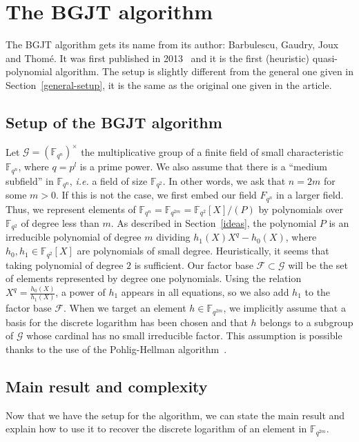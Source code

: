 \documentclass[a4paper,11pt]{article}
\theoremstyle{break}
\theoremstyle{sc}
\theoremstyle{definition}
\theoremstyle{remark}
\newcommand{\ie}{\emph{i.e. }}
\begin{document}
\section{The BGJT algorithm}
\label{bgjt}

The BGJT algorithm gets its name from its author: Barbulescu, Gaudry, Joux and
Thomé. It was first published in 2013~\cite{BGJT13} and it is the first
(heuristic) quasi-polynomial algorithm. The setup is slightly different from the
general one given in Section~\ref{general-setup}, it is the same as the original
one given in the article.

\subsection{Setup of the BGJT algorithm}

Let $\mathcal G = (\mathbb{F}_{q^n})^\times$ the multiplicative group of a finite
field of small characteristic $\mathbb{F}_{q^n}$, where $q=p^l$ is a prime
power. We also assume that there is a ``medium subfield'' in
$\mathbb{F}_{q^n}$, \ie a field of size $\mathbb{F}_{q^2}$. In other words, we
ask that $n = 2m$ for some $m>0$. If this is not the case, we first embed our
field $F_{q^n}$ in a larger field. Thus, we represent elements of
$\mathbb{F}_{q^n} = \mathbb{F}_{q^{2m}} = \mathbb{F}_{q^2}[X]/(P)$ by
polynomials over $\mathbb{F}_{q^2}$ of degree less than
$m$. As described in Section~\ref{ideas}, the polynomial $P$ is an irreducible
polynomial of degree $m$ dividing $h_1(X)X^q-h_0(X)$, where $h_0,
h_1\in\mathbb{F}_{q^2}[X]$ are polynomials of small degree. Heuristically, it
seems that taking polynomial of degree $2$ is sufficient. Our factor base
$\mathcal F\subset\mathcal G$ will be the set of elements represented by degree
one polynomials. Using the relation $X^q=\frac{h_0(X)}{h_1(X)}$, a power of
$h_1$ appears in all equations, so we also add $h_1$ to the factor base
$\mathcal F$. When we target an element $h\in\mathbb{F}_{q^{2m}}$, we implicitly
assume that a basis for the discrete logarithm has been chosen and that $h$
belongs to a subgroup of $\mathcal G$ whose cardinal has no small irreducible
factor. This assumption is possible thanks to the use of the Pohlig-Hellman
algorithm~\cite{PH78}.

\subsection{Main result and complexity}

Now that we have the setup for the algorithm, we can state the main result and
explain how to use it to recover the discrete logarithm of an element in
$\mathbb{F}_{q^{2m}}$.
\end{document}
